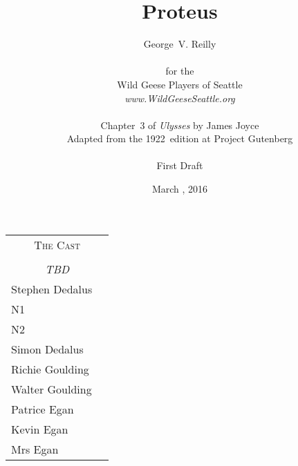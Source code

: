 


\title{\Huge Proteus}
\author{George~V. Reilly\\
\\
{\small for the}\\
Wild Geese Players of Seattle\\
{\emph{www.WildGeeseSeattle.org}}\\
\\
{\small Chapter~3 of \emph{Ulysses} by James Joyce}\\
{\small Adapted from the 1922~edition at Project Gutenberg}
\\
\\
{\small First Draft}}
\date{March , 2016}
\raggedbottom



\maketitle
\thispagestyle{empty}
\pagebreak

\begin{tabular}{lp{10cm}}
    \multicolumn{2}{c}{\Large \textsc{The Cast}} \\
\\
    \multicolumn{2}{c}{\large \textit{TBD}} \\
Stephen Dedalus \\
N1 \\
N2 \\
Simon Dedalus \\
Richie Goulding \\
Walter Goulding \\
Patrice Egan \\
Kevin Egan \\
Mrs Egan \\
\end{tabular}

\thispagestyle{empty}
\newpage


\setcounter{page}{1}








